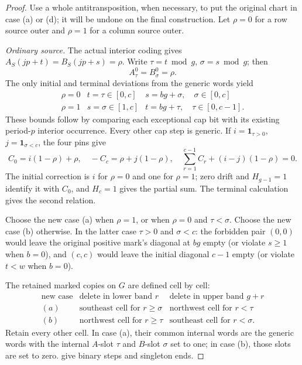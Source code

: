 \documentclass[11pt,a4paper]{amsart}
\numberwithin{equation}{section}
\theoremstyle{plain}
\theoremstyle{definition}
\newcommand{\one}{\mathbf1}
\begin{document}
\begin{proof}
Use a whole antitransposition, when necessary, to put the original chart
in case (a) or (d); it will be undone on the final construction.  Let
\(\rho=0\) for a row source outer and \(\rho=1\) for a column source outer.

\smallskip\noindent\emph{Ordinary source.}
The actual interior coding gives
\(A_S(jp+t)=B_S(jp+s)=\rho\).
Write \(\tau=t\bmod g\), \(\sigma=s\bmod g\); then
\begin{equation}\label{eq:fold-slots}
 A_\tau^0=B_\sigma^0=\rho.
\end{equation}
The only initial and terminal deviations from the generic words yield
\[
 \begin{array}{c|cc}
 \rho=0&t=\tau\in[0,c]&s=bg+\sigma,\quad\sigma\in[0,c]\\
 \rho=1&s=\sigma\in[1,c]&t=bg+\tau,\quad\tau\in[0,c-1].
 \end{array}
\]
These bounds follow by comparing each exceptional cap bit with its
existing period-\(p\) interior occurrence.  Every other cap step is generic.
If \(i=\one_{\tau>0}\), \(j=\one_{\sigma<c}\), the four pins give
\begin{equation}\label{eq:fold-cap-budget}
 C_0=i(1-\rho)+\rho,\quad
 -C_c=\rho+j(1-\rho),\quad
 \sum_{r=1}^{c-1}C_r+(i-j)(1-\rho)=0.
\end{equation}
The initial correction is \(i\) for \(\rho=0\) and one for \(\rho=1\);
zero drift and \(H_{g-1}=1\) identify it with \(C_0\), and \(H_c=1\) gives
the partial sum.  The terminal calculation gives the second relation.

Choose the new case (a) when \(\rho=1\), or when \(\rho=0\) and
\(\tau<\sigma\).  Choose the new case (b) otherwise.  In the latter case
\(\tau>0\) and \(\sigma<c\): the forbidden pair \((0,0)\) would leave the
original positive mark's diagonal at \(bg\) empty (or violate \(s\ge1\)
when \(b=0\)), and \((c,c)\) would leave the initial diagonal \(c-1\) empty
(or violate \(t<w\) when \(b=0\)).

The retained marked copies on \(G\) are defined cell by cell:
\[
 \begin{array}{c|cc}
 \text{new case}&\text{delete in lower band }r&
                         \text{delete in upper band }g+r\\\hline
 (a)&\text{southeast cell for }r\ge\sigma&
                         \text{northwest cell for }r<\tau\\
 (b)&\text{northwest cell for }r\ge\tau&
                         \text{southeast cell for }r<\sigma.
 \end{array}
\]
Retain every other cell.  In case (a), their common internal words are
the generic words with the internal \(A\)-slot \(\tau\) and \(B\)-slot \(\sigma\)
set to one; in case (b), those slots are set to zero.
 give binary steps and singleton ends.


\end{proof}
\end{document}
